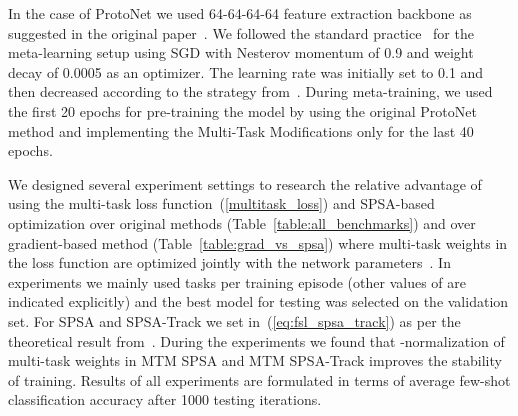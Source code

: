 \documentclass{article}
\begin{document}
In the case of ProtoNet we used 64-64-64-64 feature extraction backbone  as suggested in the original paper~\cite{NIPS2017_cb8da676}. We followed the standard practice~\cite{gidaris2018dynamic} for the meta-learning setup using SGD with Nesterov momentum of 0.9 and weight decay of 0.0005 as an optimizer. The learning rate was initially set to 0.1 and then decreased according to the strategy from~\cite{gidaris2018dynamic}. During meta-training, we used the first 20 epochs for pre-training the model by using the original ProtoNet method and implementing the Multi-Task Modifications only for the last 40 epochs. 

We designed several experiment settings to research the relative advantage of using the multi-task loss function~(\ref{multitask_loss}) and SPSA-based optimization over original methods (Table~\ref{table:all_benchmarks}) and over gradient-based method (Table~\ref{table:grad_vs_spsa}) where multi-task weights in the loss function are optimized jointly with the network parameters~. In experiments we mainly used  tasks per training episode  (other values of  are indicated explicitly) and the best model for testing was selected on the validation set. For SPSA and SPSA-Track we set  in~(\ref{eq:fsl_spsa_track}) as per the theoretical result from~\cite{granichin2015randomized}. During the experiments we found that -normalization of multi-task weights in MTM SPSA and MTM SPSA-Track improves the stability of training. Results of all experiments are formulated in terms of average few-shot classification accuracy after 1000 testing iterations.
\end{document}
